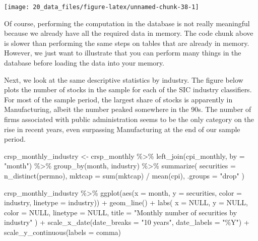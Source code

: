 \documentclass[
]{krantz}
\newenvironment{Shaded}{\begin{snugshade}}{\end{snugshade}}
\newcommand{\AttributeTok}[1]{\textcolor[rgb]{0.61,0.61,0.61}{#1}}
\newcommand{\ConstantTok}[1]{\textcolor[rgb]{0,0,0}{#1}}
\newcommand{\FunctionTok}[1]{\textcolor[rgb]{0,0,0}{#1}}
\newcommand{\NormalTok}[1]{#1}
\newcommand{\OtherTok}[1]{\textcolor[rgb]{0.37,0.37,0.37}{#1}}
\newcommand{\SpecialCharTok}[1]{\textcolor[rgb]{0,0,0}{#1}}
\newcommand{\StringTok}[1]{\textcolor[rgb]{0.5,0.5,0.5}{#1}}
\begin{document}
\begin{center}\texttt{[image: 20\_data\_files/figure-latex/unnamed-chunk-38-1]} \end{center}

Of course, performing the computation in the database is not really meaningful because we already have all the required data in memory. The code chunk above is slower than performing the same steps on tables that are already in memory. However, we just want to illustrate that you can perform many things in the database before loading the data into your memory.

Next, we look at the same descriptive statistics by industry. The figure below plots the number of stocks in the sample for each of the SIC industry classifiers. For most of the sample period, the largest share of stocks is apparently in Manufacturing, albeit the number peaked somewhere in the 90s. The number of firms associated with public administration seems to be the only category on the rise in recent years, even surpassing Manufacturing at the end of our sample period.

\begin{Shaded}
\begin{Highlighting}[]
\NormalTok{crsp\_monthly\_industry }\OtherTok{\textless{}{-}}\NormalTok{ crsp\_monthly }\SpecialCharTok{\%\textgreater{}\%}
  \FunctionTok{left\_join}\NormalTok{(cpi\_monthly, }\AttributeTok{by =} \StringTok{"month"}\NormalTok{) }\SpecialCharTok{\%\textgreater{}\%}
  \FunctionTok{group\_by}\NormalTok{(month, industry) }\SpecialCharTok{\%\textgreater{}\%}
  \FunctionTok{summarize}\NormalTok{(}
    \AttributeTok{securities =} \FunctionTok{n\_distinct}\NormalTok{(permno),}
    \AttributeTok{mktcap =} \FunctionTok{sum}\NormalTok{(mktcap) }\SpecialCharTok{/} \FunctionTok{mean}\NormalTok{(cpi),}
    \AttributeTok{.groups =} \StringTok{"drop"}
\NormalTok{  )}

\NormalTok{crsp\_monthly\_industry }\SpecialCharTok{\%\textgreater{}\%}
  \FunctionTok{ggplot}\NormalTok{(}\FunctionTok{aes}\NormalTok{(}\AttributeTok{x =}\NormalTok{ month, }\AttributeTok{y =}\NormalTok{ securities, }\AttributeTok{color =}\NormalTok{ industry, }\AttributeTok{linetype =}\NormalTok{ industry)) }\SpecialCharTok{+}
  \FunctionTok{geom\_line}\NormalTok{() }\SpecialCharTok{+}
  \FunctionTok{labs}\NormalTok{(}
    \AttributeTok{x =} \ConstantTok{NULL}\NormalTok{, }\AttributeTok{y =} \ConstantTok{NULL}\NormalTok{, }\AttributeTok{color =} \ConstantTok{NULL}\NormalTok{, }\AttributeTok{linetype =} \ConstantTok{NULL}\NormalTok{,}
    \AttributeTok{title =} \StringTok{"Monthly number of securities by industry"}
\NormalTok{  ) }\SpecialCharTok{+}
  \FunctionTok{scale\_x\_date}\NormalTok{(}\AttributeTok{date\_breaks =} \StringTok{"10 years"}\NormalTok{, }\AttributeTok{date\_labels =} \StringTok{"\%Y"}\NormalTok{) }\SpecialCharTok{+}
  \FunctionTok{scale\_y\_continuous}\NormalTok{(}\AttributeTok{labels =}\NormalTok{ comma)}
\end{Highlighting}
\end{Shaded}
\end{document}
